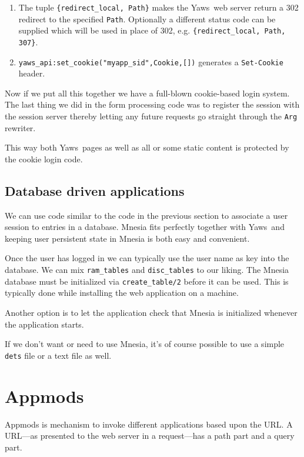 \documentclass[11pt,oneside,english]{book}
\newcommand{\Yaws}            %
        {{\sc Yaws}}
\begin{document}
\begin{enumerate}

\item The tuple \verb+{redirect_local, Path}+ makes the \Yaws\ web
  server return a 302 redirect to the specified \verb+Path+.
  Optionally a different status code can be supplied which will be
  used in place of 302, e.g.  \verb+{redirect_local, Path, 307}+.

\item \verb+yaws_api:set_cookie("myapp_sid",Cookie,[])+ generates a
  \verb+Set-Cookie+ header.
\end{enumerate}

Now if we put all this together we have a full-blown cookie-based
login system. The last thing we did in the form processing code was
to register the session with the session server thereby letting any
future requests go straight through the \verb+Arg+ rewriter.

This way both \Yaws\  pages as well as all or some static content
is protected by the cookie login code.

\subsection{Database driven applications}

We can use code similar to the code in the previous section to associate
a user session to entries in a database. Mnesia fits perfectly
together with \Yaws\  and keeping user persistent state in Mnesia is
both easy and convenient.

Once the user has logged in we can typically use the user name as key
into the database. We can mix \verb+ram_tables+ and \verb+disc_tables+
to our liking. The Mnesia database must be initialized via
\verb+create_table/2+ before it can be used. This is typically done
while installing the web application on a machine.

Another option is to let the application check that Mnesia
is initialized whenever the application starts.

If we don't want or need to use Mnesia, it's of course possible
to use a simple \verb+dets+ file or a text file as well.

\section{Appmods}
\label{appmods}

Appmods is mechanism to invoke different applications based upon the
URL. A URL---as presented to the web server in a request---has a path
part and a query part.
\end{document}
